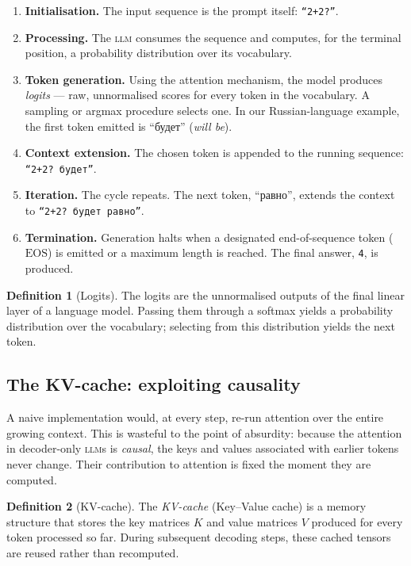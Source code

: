 \documentclass[11pt,a4paper]{article}
\theoremstyle{definition}
\newtheorem{definition}{Definition}[section]
\theoremstyle{plain}
\newcommand{\LLM}{\textsc{llm}}
\begin{document}
\begin{enumerate}[leftmargin=*,itemsep=2pt]
    \item \textbf{Initialisation.} The input sequence is the prompt itself: \texttt{``2+2?''}.
    \item \textbf{Processing.} The \LLM{} consumes the sequence and computes, for the terminal position, a probability distribution over its vocabulary.
    \item \textbf{Token generation.} Using the attention mechanism, the model produces \emph{logits} --- raw, unnormalised scores for every token in the vocabulary. A sampling or argmax procedure selects one. In our Russian-language example, the first token emitted is \foreignlanguage{russian}{``будет''} (\emph{will be}).
    \item \textbf{Context extension.} The chosen token is appended to the running sequence: \texttt{``2+2? будет''}.
    \item \textbf{Iteration.} The cycle repeats. The next token, \foreignlanguage{russian}{``равно''}, extends the context to \texttt{``2+2? будет равно''}.
    \item \textbf{Termination.} Generation halts when a designated end-of-sequence token ($\text{EOS}$) is emitted or a maximum length is reached. The final answer, \texttt{4}, is produced.
\end{enumerate}

\begin{definition}[Logits]
The logits are the unnormalised outputs of the final linear layer of a language model. Passing them through a softmax yields a probability distribution over the vocabulary; selecting from this distribution yields the next token.
\end{definition}

\subsection{The KV-cache: exploiting causality}


A naive implementation would, at every step, re-run attention over the entire growing context. This is wasteful to the point of absurdity: because the attention in decoder-only \LLM{}s is \emph{causal}, the keys and values associated with earlier tokens never change. Their contribution to attention is fixed the moment they are computed.

\begin{definition}[KV-cache]
The \emph{KV-cache} (Key--Value cache) is a memory structure that stores the key matrices $K$ and value matrices $V$ produced for every token processed so far. During subsequent decoding steps, these cached tensors are reused rather than recomputed.
\end{definition}
\end{document}
